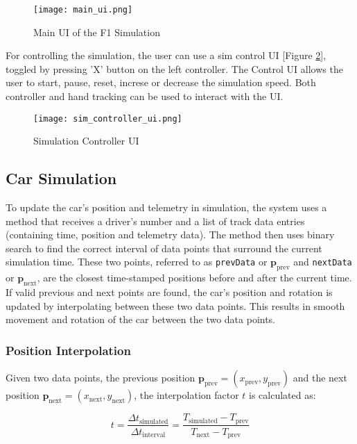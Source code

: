 \documentclass[
	a4paper, %
	10pt, %
	unnumberedsections, %
	twoside, %
]{LTJournalArticle}
\begin{document}
\begin{figure}[h] %
	\texttt{[image: main\_ui.png]}
	\caption{Main UI of the F1 Simulation}
    \label{fig:main_ui_unity}
\end{figure}

For controlling the simulation, the user can use a sim control UI [Figure \ref{fig:sim_controller_ui}], toggled by pressing 'X' button on the left controller.
The Control UI allows the user to start, pause, reset, increse or decrease the simulation speed. Both controller and hand tracking can be used to interact with the UI.

\begin{figure}[h] %
	\texttt{[image: sim\_controller\_ui.png]}
	\caption{Simulation Controller UI}
    \label{fig:sim_controller_ui}
\end{figure}

\subsection{Car Simulation}

To update the car's position and telemetry in simulation, the system uses a method that receives a driver's number and a list of track data entries (containing time, position and telemetry data). 
The method then uses binary search to find the correct interval of data points that surround the current simulation time. These two points, referred to as \verb|prevData| or $\mathbf{p}_{\text{prev}}$ and \verb|nextData| or $\mathbf{p}_{\text{next}}$, are the closest time-stamped positions before and after the current time. 
If valid previous and next points are found, the car's position and rotation is updated by interpolating between these two data points. This results in smooth movement and rotation of the car between the two data points.

\subsubsection{Position Interpolation}
Given two data points, the previous position $\mathbf{p}_{\text{prev}} = (x_{\text{prev}}, y_{\text{prev}})$ and the next position $\mathbf{p}_{\text{next}} = (x_{\text{next}}, y_{\text{next}})$, the interpolation factor $t$ is calculated as:

\[
t = \frac{\Delta t_{\text{simulated}}}{\Delta t_{\text{interval}}} = \frac{T_{\text{simulated}} - T_{\text{prev}}}{T_{\text{next}} - T_{\text{prev}}}
\]
\end{document}
